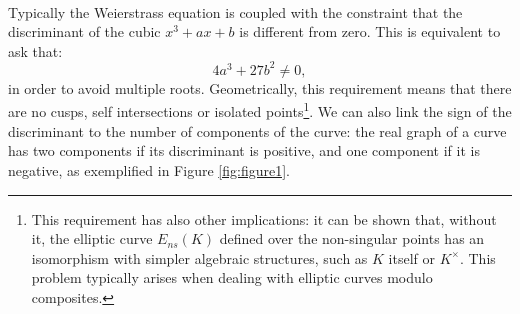 \\
Typically the Weierstrass equation is coupled with the constraint that the discriminant of the cubic $x^3 + ax + b$ is different from zero. This is equivalent to ask that:
$$4a^3 + 27b^2 \neq 0,$$ 
in order to avoid multiple roots. Geometrically, this requirement means that there are no cusps, self intersections or isolated points\footnote{This requirement has also other implications: it can be shown that, without it, the elliptic curve $E_{ns}(K)$ defined over the non-singular points has an isomorphism with simpler algebraic structures, such as $K$ itself or $K^{\times}$. This problem typically arises when dealing with elliptic curves modulo composites.}. 
We can also link the sign of the discriminant to the number of components of the curve: the real graph of a curve has two components if its discriminant is positive, and one component if it is negative, as exemplified in Figure \ref{fig:figure1}.

